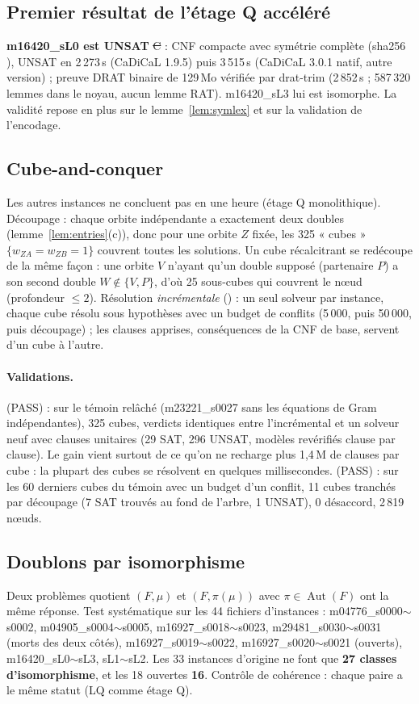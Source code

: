 \subsection{Premier résultat de l'étage Q accéléré}
\textbf{m16420\_sL0 est UNSAT} \st{C} : CNF compacte avec symétrie complète (sha256 ), UNSAT en 2\,273\,s (CaDiCaL 1.9.5) puis
3\,515\,s (CaDiCaL 3.0.1 natif, autre version) ; preuve DRAT binaire de 129\,Mo vérifiée par drat-trim (2\,852\,s ; 587\,320 lemmes dans le noyau,
aucun lemme RAT). m16420\_sL3 lui est isomorphe. La validité repose en plus sur le lemme~\ref{lem:symlex} et sur la validation de l'encodage.

\subsection{Cube-and-conquer}
Les autres instances ne concluent pas en une heure (étage Q monolithique). Découpage : chaque orbite indépendante a exactement deux doubles
(lemme~\ref{lem:entries}(c)), donc pour une orbite $Z$ fixée, les 325 « cubes » $\{w_{ZA}=w_{ZB}=1\}$ couvrent toutes les solutions. Un cube
récalcitrant se redécoupe de la même façon : une orbite $V$ n'ayant qu'un double supposé (partenaire $P$) a son second double $W\notin\{V,P\}$,
d'où 25 sous-cubes qui couvrent le nœud (profondeur $\le2$). Résolution \emph{incrémentale} () : un seul solveur par
instance, chaque cube résolu sous hypothèses avec un budget de conflits (5\,000, puis 50\,000, puis découpage) ; les clauses apprises, conséquences
de la CNF de base, servent d'un cube à l'autre.
\paragraph{Validations.}  (PASS) : sur le témoin relâché (m23221\_s0027 sans les équations de Gram indépendantes), 325 cubes,
verdicts identiques entre l'incrémental et un solveur neuf avec clauses unitaires (29 SAT, 296 UNSAT, modèles revérifiés clause par clause).
Le gain vient surtout de ce qu'on ne recharge plus 1,4\,M de clauses par cube : la plupart des cubes se résolvent en quelques millisecondes.
 (PASS) : sur les 60 derniers cubes du témoin avec un budget d'un conflit, 11 cubes tranchés par découpage (7 SAT trouvés
au fond de l'arbre, 1 UNSAT), 0 désaccord, 2\,819 nœuds.

\subsection{Doublons par isomorphisme}
Deux problèmes quotient $(F,\mu)$ et $(F,\pi(\mu))$ avec $\pi\in\operatorname{Aut}(F)$ ont la même réponse. Test systématique sur les 44 fichiers
d'instances : m04776\_s0000$\sim$s0002, m04905\_s0004$\sim$s0005, m16927\_s0018$\sim$s0023, m29481\_s0030$\sim$s0031 (morts des deux côtés),
m16927\_s0019$\sim$s0022, m16927\_s0020$\sim$s0021 (ouverts), m16420\_sL0$\sim$sL3, sL1$\sim$sL2. Les 33 instances d'origine ne font que
\textbf{27 classes d'isomorphisme}, et les 18 ouvertes \textbf{16}. Contrôle de cohérence : chaque paire a le même statut (LQ comme étage Q).

